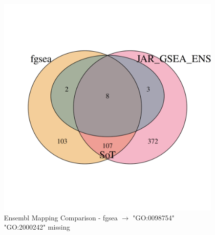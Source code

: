 \documentclass[12pt]{article}
\begin{document}
\begin{figure}[htpb]
\begin{minipage}{0.49\textwidth}
        \includegraphics[width=\textwidth]{./plots/ens_mappingCompgfgsea.png}
        \caption{Ensembl Mapping Comparison - fgsea $\to$ "GO:0098754" "GO:2000242" missing}
        \label{fig:ens-mapping-fgsea}
    \end{minipage}
\end{figure}





\printbibliography
\end{document}
